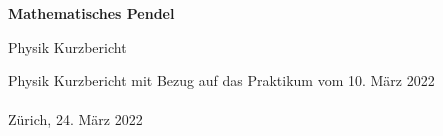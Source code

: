 
\begin{titlepage}

    \begin{center}
        \vspace*{8cm}
        \Huge
        \textbf{Mathematisches Pendel}
 
        \vspace{0.5cm}
        \LARGE
        Physik Kurzbericht  
    \end{center}
    \vspace*{8cm}
    \normalsize
    \hspace*{2cm}Physik Kurzbericht mit Bezug auf das Praktikum vom 10. März 2022\\\\
    \hspace*{2cm}Zürich, 24. März 2022
    
             
 \end{titlepage}